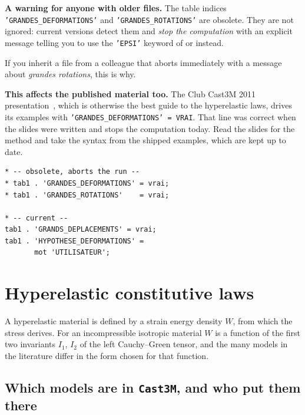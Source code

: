 \begin{castemcom}
%
%
\textbf{A warning for anyone with older files.} The  table
indices \texttt{'GRANDES\_DEFORMATIONS'} and \texttt{'GRANDES\_ROTATIONS'}
are obsolete. They are not ignored: current versions detect them and
\emph{stop the computation} with an explicit message telling you to use the
\texttt{'EPSI'} keyword of  or  instead.

If you inherit a file from a colleague that aborts immediately with a message
about \emph{grandes rotations}, this is why.

\medskip
\textbf{This affects the published material too.} The Club Cast3M 2011
presentation~\cite{Gornet:club2011}, which is otherwise the best guide to the
hyperelastic laws, drives its examples with
\texttt{'GRANDES\_DEFORMATIONS' = VRAI}. That line was correct when the
slides were written and stops the computation today. Read the slides for the
method and take the syntax from the shipped examples, which are kept up to
date.
\end{castemcom}
\begin{castemlines}
\begin{verbatim}
* -- obsolete, aborts the run --
* tab1 . 'GRANDES_DEFORMATIONS' = vrai;
* tab1 . 'GRANDES_ROTATIONS'    = vrai;

* -- current --
tab1 . 'GRANDS_DEPLACEMENTS' = vrai;
tab1 . 'HYPOTHESE_DEFORMATIONS' =
       mot 'UTILISATEUR';
\end{verbatim}
\end{castemlines}

\section{Hyperelastic constitutive laws}
\label{sec:ls:hyper}

%
%
A hyperelastic material is defined by a strain energy density $W$, from which
the stress derives. For an incompressible isotropic material $W$ is a
function of the first two invariants $I_{1}$, $I_{2}$ of the left
Cauchy--Green tensor, and the many models in the literature differ in the
form chosen for that function.

\subsection*{Which models are in \texttt{Cast3M}, and who put them there}

